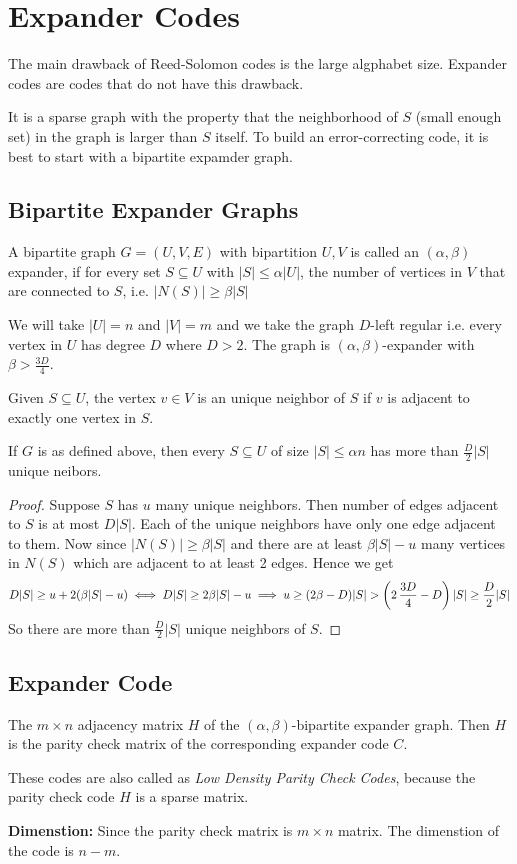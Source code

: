 \chapter{Expander Codes}
The main drawback of Reed-Solomon codes is the large algphabet size. Expander codes are codes that do not have this drawback.

It is a sparse graph with the property that the neighborhood of $S$ (small enough set) in the graph is larger than $S$ itself. To build an error-correcting code, it is best to start with a bipartite expamder graph.
\section{Bipartite Expander Graphs}
\begin{definition}
	A bipartite graph $G=(U,V,E)$ with bipartition $U,V$ is called an $(\alpha,\beta)$ expander, if for every set $S\subseteq U$ with $|S|\leq \alpha|U|$, the number of vertices in $V$ that are connected to $S$, i.e. $|N(S)|\geq \beta|S|$
\end{definition}
We will take $|U|=n$ and $|V|=m$ and we take the graph $D$-left regular i.e. every vertex in $U$ has degree $D$ where $D>2$. The graph is $(\alpha,\beta)$-expander with $\beta>\frac{3D}{4}$.
\begin{definition}
	Given $S\subseteq U$, the vertex $v\in V$ is  an unique neighbor of $S$ if $v$ is adjacent to exactly one vertex in $S$.
\end{definition}
\begin{theorem}\label{uniqevertexexpander}
	If $G$ is as defined above, then every $S\subseteq U$ of size $|S|\leq \alpha n$ has more than $\frac{D}2|S|$ unique neibors.
\end{theorem}
\begin{proof}
	Suppose $S$ has $u$ many unique neighbors. Then number of edges adjacent to $S$ is at most $D|S|$. Each of the unique neighbors have only one edge adjacent to them.  Now since $|N(S)|\geq \beta|S|$ and there are at least $\beta|S|-u$ many vertices in $N(S)$ which are adjacent to at least 2 edges. Hence we get $$D|S|\geq u+2(\beta|S|-u)\iff D|S|\geq 2\beta|S|-u\implies u\geq (2\beta-D)|S|>\lt(2\, \frac{3D}4-D\rt)|S|\geq \frac{D}{2}|S|$$So there are more than $\frac{D}2|S|$ unique neighbors of $S$.
\end{proof}
\section{Expander Code}
\begin{definition}
	The $m\times n$ adjacency matrix $H$ of the $(\alpha,\beta)$-bipartite expander graph. Then $H$ is the parity check matrix of the corresponding expander code $C$.
\end{definition}
\begin{remark}
	These codes are also called as \textit{Low Density Parity Check Codes}, because the parity check code $H$ is a sparse matrix. 
\end{remark}
\parinf
\textbf{Dimenstion:}  Since the parity check matrix is $m\times n$ matrix. The dimenstion of the code is $n-m$.

